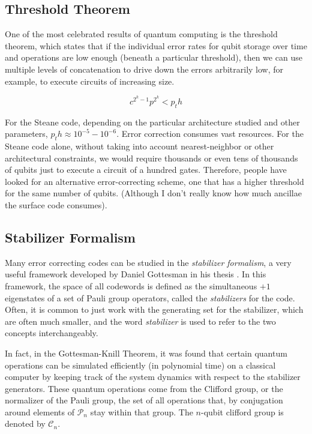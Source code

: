 \subsection{Threshold Theorem}

One of the most celebrated results of quantum computing is the threshold
theorem, which states that if the individual error rates for qubit storage
over time and operations are low enough (beneath a particular threshold),
then we can use multiple levels of concatenation to drive down the errors
arbitrarily low, for example, to execute circuits of increasing size.

\begin{displaymath}
c^{2^k-1}p^{2^k} < p_th
\end{displaymath}

For the Steane code, depending on the particular architecture studied and
other parameters, $p_th \approx 10^{-5} - 10^{-6}$.
Error correction consumes vast resources. For the Steane code alone, without
taking into account nearest-neighbor or other architectural constraints, we
would require thousands or even tens of thousands of qubits just to execute a
circuit of a hundred gates. Therefore, people have looked for an alternative
error-correcting scheme, one that has a higher threshold for the same number
of qubits. (Although I don't really know how much ancillae the surface code
consumes).

\subsection{Stabilizer Formalism}

Many error correcting codes can be studied in the \emph{stabilizer formalism},
a very useful framework developed by Daniel Gottesman in his thesis
\cite{Gottesman1997}. In this framework, the space of all codewords is
defined as the simultaneous $+1$ eigenstates of a set of Pauli group
operators, called the \emph{stabilizers} for the code. Often, it is common
to just work with the generating set for the stabilizer, which are often
much smaller, and the word \emph{stabilizer} is used to refer to the two
concepts interchangeably.

In fact, in the Gottesman-Knill Theorem, it was found that certain quantum
operations can be simulated efficiently (in polynomial time) on a classical
computer by keeping track of the system dynamics with respect to the
stabilizer generators. These quantum operations come from the Clifford
group, or the normalizer of the Pauli group, the set of all operations
that, by conjugation around elements of $\mathcal{P}_n$ stay within that group.
The $n$-qubit clifford group is denoted by $\mathcal{C}_n$.

